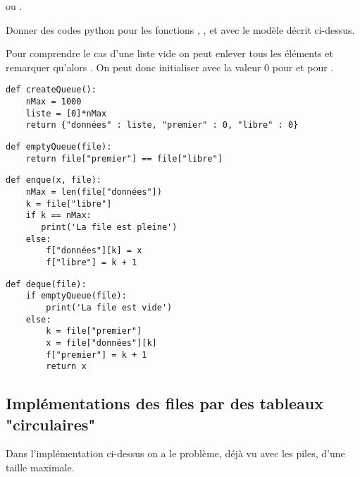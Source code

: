  ou . 
\begin{Exercise}[title = {Implémentations d'une file à l'aide d'une liste}]\it

Donner des codes python pour les fonctions  ,  ,   et  avec le modèle décrit ci-dessus.
\end{Exercise} 
\begin{Answer}
Pour comprendre le cas d'une liste vide on peut enlever tous les éléments et remarquer qu'alors . On peut donc initialiser avec la valeur 0 pour  et pour .
\begin{lstlisting}
def createQueue():
    nMax = 1000
    liste = [0]*nMax
    return {"données" : liste, "premier" : 0, "libre" : 0}
\end{lstlisting}

\begin{lstlisting}
def emptyQueue(file):
    return file["premier"] == file["libre"]
\end{lstlisting}

\begin{lstlisting}
def enque(x, file):
    nMax = len(file["données"])
    k = file["libre"]
    if k == nMax:
       print('La file est pleine')
    else:
        f["données"][k] = x
        f["libre"] = k + 1
\end{lstlisting}

\begin{lstlisting}
def deque(file):
    if emptyQueue(file):
        print('La file est vide')
    else:
        k = file["premier"]
        x = file["données"][k]
        f["premier"] = k + 1
        return x
\end{lstlisting}
\end{Answer}
\newpage
\subsection{Implémentations des files par des tableaux "circulaires"}
Dans l'implémentation ci-dessus on a le problème, déjà vu avec les piles, d'une taille maximale.

